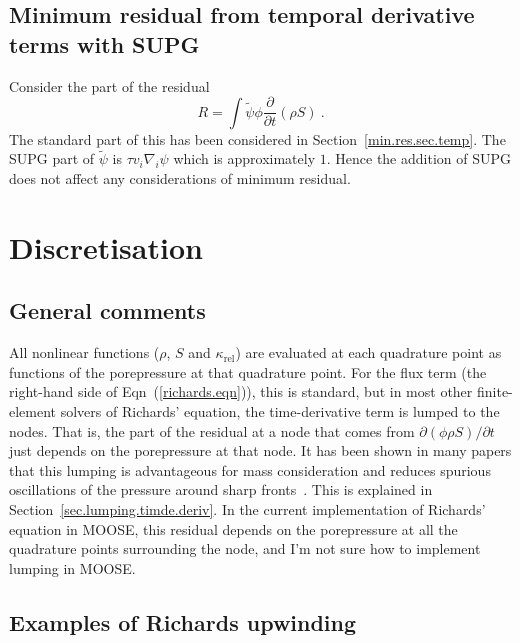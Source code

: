 \documentclass[]{scrreprt}
\begin{document}
\section{Minimum residual from temporal derivative terms with SUPG}

Consider the part of the residual
\begin{equation}
R = \int \tilde{\psi} \phi \frac{\partial}{\partial t} \left( \rho S \right)
\ .
\end{equation}
The standard part of this has been considered in
Section~\ref{min.res.sec.temp}.  The SUPG part of $\tilde{\psi}$ is
$\tau v_{i}\nabla_{i}\psi$ which is approximately $1$.  Hence the
addition of SUPG does not affect any considerations of minimum residual.




\chapter{Discretisation}
\label{discret.chap}

\section{General comments}

All nonlinear functions ($\rho$, $S$ and $\kappa_{\mathrm{rel}}$) are
evaluated at each quadrature point as functions of the porepressure at
that quadrature point.  For the flux term (the right-hand side of
Eqn~(\ref{richards.eqn})), this is standard, but in most other
finite-element solvers of Richards' equation, the time-derivative term
is lumped to the nodes.  That is, the part of the residual at a node
that comes from $\partial(\phi\rho S)/\partial t$ just depends on the
porepressure at that node.  It has been shown in many papers that this
lumping is advantageous for mass consideration and reduces spurious
oscillations of the pressure around sharp fronts~\cite{celiaET1990}.
This is explained in Section~\ref{sec.lumping.timde.deriv}.  In the
current implementation of Richards' equation in MOOSE, this residual
depends on the porepressure at all the quadrature points surrounding
the node, and I'm not sure how to implement lumping in MOOSE.



\section{Examples of Richards upwinding}
\end{document}
